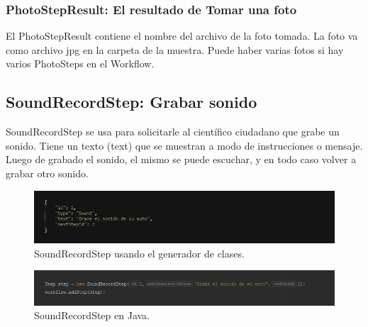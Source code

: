 \subsubsection{PhotoStepResult: El resultado de Tomar una foto}
El PhotoStepResult contiene el nombre del archivo de la foto tomada. La foto va como archivo jpg en la carpeta de la muestra.
Puede haber varias fotos si hay varios PhotoSteps en el Workflow.




\subsection{SoundRecordStep: Grabar sonido}
SoundRecordStep  se usa para solicitarle al científico ciudadano que grabe un sonido. Tiene un texto (text) que se muestran a modo de instrucciones o mensaje. Luego de grabado el sonido, el mismo se puede escuchar, y en todo caso volver a grabar otro sonido.


\begin{figure}[H]
  \centering
    \includegraphics[scale=0.6]{50-anexos/C-steps/sound_json.png} 
    \caption{SoundRecordStep usando el generador de clases.}
\end{figure}	

\begin{figure}[H]
  \centering
    \includegraphics[scale=0.6]{50-anexos/C-steps/sound_java.png} 
    \caption{SoundRecordStep en Java.}
\end{figure}

